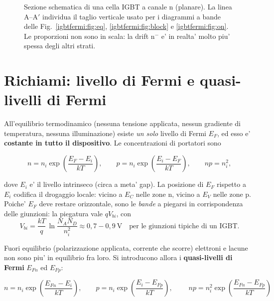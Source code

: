 \begin{figure}[H]
\caption{Sezione schematica di una cella IGBT a canale n (planare). La linea
A--A$'$ individua il taglio verticale usato per i diagrammi a bande delle
Fig.~\ref{igbtfermi:fig:eq}, \ref{igbtfermi:fig:block} e \ref{igbtfermi:fig:on}. Le proporzioni non sono in
scala: la drift $\mathrm{n^{-}}$ e' in realta' molto piu' spessa degli altri
strati.}
\label{igbtfermi:fig:struttura}
\end{figure}

\section{Richiami: livello di Fermi e quasi-livelli di Fermi}

All'equilibrio termodinamico (nessuna tensione applicata, nessun gradiente di
temperatura, nessuna illuminazione) esiste \emph{un solo} livello di Fermi
$E_F$, ed esso e' \textbf{costante in tutto il dispositivo}. Le concentrazioni
di portatori sono

\begin{equation}
n = n_i \exp\!\left(\frac{E_F-E_i}{kT}\right),
\qquad
p = n_i \exp\!\left(\frac{E_i-E_F}{kT}\right),
\qquad
np = n_i^2 ,
\end{equation}

dove $E_i$ e' il livello intrinseco (circa a meta' gap). La posizione di $E_F$
rispetto a $E_i$ codifica il drogaggio locale: vicino a $E_C$ nelle zone n,
vicino a $E_V$ nelle zone p. Poiche' $E_F$ deve restare orizzontale, sono le
\emph{bande} a piegarsi in corrispondenza delle giunzioni: la piegatura vale
$qV_{bi}$, con
\begin{equation}
V_{bi} = \frac{kT}{q}\,\ln\!\frac{N_A N_D}{n_i^{2}} \approx 0{,}7\!-\!0{,}9~\mathrm{V}
\quad\text{per le giunzioni tipiche di un IGBT.}
\end{equation}

Fuori equilibrio (polarizzazione applicata, corrente che scorre) elettroni e
lacune non sono piu' in equilibrio fra loro. Si introducono allora i
\textbf{quasi-livelli di Fermi} $E_{Fn}$ ed $E_{Fp}$:

\begin{equation}
n = n_i \exp\!\left(\frac{E_{Fn}-E_i}{kT}\right),\qquad
p = n_i \exp\!\left(\frac{E_i-E_{Fp}}{kT}\right),\qquad
\boxed{\;np = n_i^{2}\exp\!\left(\frac{E_{Fn}-E_{Fp}}{kT}\right)\;}
\end{equation}

